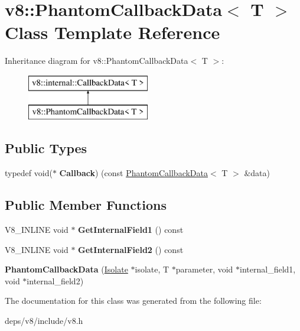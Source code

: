 \hypertarget{classv8_1_1_phantom_callback_data}{}\section{v8\+:\+:Phantom\+Callback\+Data$<$ T $>$ Class Template Reference}
\label{classv8_1_1_phantom_callback_data}
Inheritance diagram for v8\+:\+:Phantom\+Callback\+Data$<$ T $>$\+:\begin{figure}[H]
\begin{center}
\leavevmode
\includegraphics[height=2.000000cm]{classv8_1_1_phantom_callback_data}
\end{center}
\end{figure}
\subsection*{Public Types}
\begin{DoxyCompactItemize}
\item 
\hypertarget{classv8_1_1_phantom_callback_data_abc9d3785b5329fa1163003b9691b1346}{}typedef void($\ast$ {\bfseries Callback}) (const \hyperlink{classv8_1_1_phantom_callback_data}{Phantom\+Callback\+Data}$<$ T $>$ \&data)\label{classv8_1_1_phantom_callback_data_abc9d3785b5329fa1163003b9691b1346}

\end{DoxyCompactItemize}
\subsection*{Public Member Functions}
\begin{DoxyCompactItemize}
\item 
\hypertarget{classv8_1_1_phantom_callback_data_af49a17ab52e710584c456c8b733fb4d9}{}V8\+\_\+\+I\+N\+L\+I\+N\+E void $\ast$ {\bfseries Get\+Internal\+Field1} () const \label{classv8_1_1_phantom_callback_data_af49a17ab52e710584c456c8b733fb4d9}

\item 
\hypertarget{classv8_1_1_phantom_callback_data_a4dfb27267252512129666bcbe1a6ec79}{}V8\+\_\+\+I\+N\+L\+I\+N\+E void $\ast$ {\bfseries Get\+Internal\+Field2} () const \label{classv8_1_1_phantom_callback_data_a4dfb27267252512129666bcbe1a6ec79}

\item 
\hypertarget{classv8_1_1_phantom_callback_data_aa88134c20b4f65a139050a265a1a0d50}{}{\bfseries Phantom\+Callback\+Data} (\hyperlink{classv8_1_1_isolate}{Isolate} $\ast$isolate, T $\ast$parameter, void $\ast$internal\+\_\+field1, void $\ast$internal\+\_\+field2)\label{classv8_1_1_phantom_callback_data_aa88134c20b4f65a139050a265a1a0d50}

\end{DoxyCompactItemize}


The documentation for this class was generated from the following file\+:\begin{DoxyCompactItemize}
\item 
deps/v8/include/v8.\+h\end{DoxyCompactItemize}
